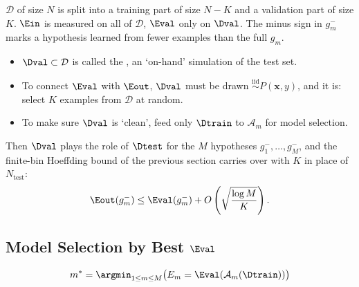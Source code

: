 \begin{center}
\end{center}

\(\mathcal{D}\) of size \(N\) is split into a training part of size \(N - K\)
and a validation part of size \(K\). \(\Ein\) is measured on all of
\(\mathcal{D}\), \(\Eval\) only on \(\Dval\). The minus sign in \(g_m^-\)
marks a hypothesis learned from fewer examples than the full \(g_m\).
\begin{itemize}
    \item \(\Dval \subset \mathcal{D}\) is called the ,
        an `on-hand' simulation of the test set.
    \item To connect \(\Eval\) with \(\Eout\), \(\Dval\) must be drawn
        \(\overset{\text{iid}}{\sim} P(\bm{x}, y)\), and it is: select \(K\)
        examples from \(\mathcal{D}\) at random.
    \item To make sure \(\Dval\) is `clean', feed only \(\Dtrain\) to
        \(\mathcal{A}_m\) for model selection.
\end{itemize}
Then \(\Dval\) plays the role of \(\Dtest\) for the \(M\) hypotheses \(g_1^-,
\ldots, g_M^-\), and the finite-bin Hoeffding bound of the previous section
carries over with \(K\) in place of \(N_{\mathrm{test}}\):
\[
    \Eout(g_m^-) \le \Eval(g_m^-) + O \left( \sqrt{\frac{\log M}{K}} \right) .
\]

\subsection{Model Selection by Best \texorpdfstring{\(\Eval\)}{Eval}}

\[
    m^* = \argmin_{1 \le m \le M} \bigl( E_m =
    \Eval(\mathcal{A}_m(\Dtrain)) \bigr)
\]

